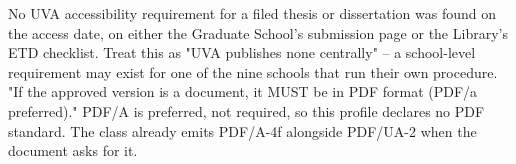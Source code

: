 %
	{No UVA accessibility requirement for a filed thesis or dissertation was
	 found on the access date, on either the Graduate School's submission page
	 or the Library's ETD checklist. Treat this as "UVA publishes none centrally"
	 -- a school-level requirement may exist for one of the nine schools that run
	 their own procedure.}
	{"If the approved version is a document, it MUST be in PDF format (PDF/a
	 preferred)." PDF/A is preferred, not required, so this profile declares no
	 PDF standard. The class already emits PDF/A-4f alongside PDF/UA-2 when the
	 document asks for it.}

%
%
%
%
\providecommand{\uvahometown}{}
\providecommand{\uvapriordegrees}{}
\providecommand{\thesisuvahometown}[1]{\renewcommand{\uvahometown}{#1}}
\providecommand{\thesisuvapriordegrees}[1]{\renewcommand{\uvapriordegrees}{#1}}

